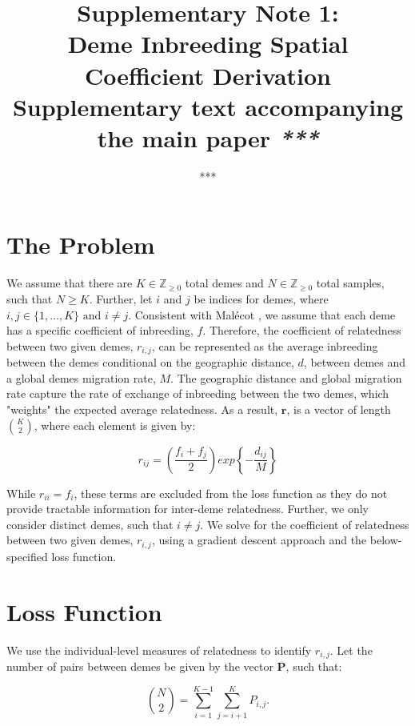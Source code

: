 \documentclass[a4paper, 12pt]{article}
\title{%
  Supplementary Note 1: \\ \vspace{2mm}
  Deme Inbreeding Spatial Coefficient Derivation \\ \vspace{2mm}
  \large Supplementary text accompanying the main paper \emph{***}}
\author{***}
\begin{document}
\maketitle

\section{The Problem}

We assume that there are $K \in \mathbb{Z}_{\geq 0}$ total demes and $N \in \mathbb{Z}_{\geq 0}$ total samples, such that $N \geq K$. Further, let $i$ and $j$ be indices for demes, where $ i, j \in \{1, \dots, K\} \text{ and } i \neq j$. Consistent with Mal\'ecot \cite{Malecot1970, Malecot1973}, we assume that each deme has a specific coefficient of inbreeding, $f$. Therefore, the coefficient of relatedness between two given demes, $r_{i,j}$, can be represented as the average inbreeding between the demes conditional on the geographic distance, $d$, between demes and a global demes migration rate, $M$. The geographic distance and global migration rate capture the rate of exchange of inbreeding between the two demes, which "weights" the expected average relatedness. As a result, $\mathbf{r}$, is a vector of length ${K\choose2}$, where each element is given by:

%
\begin{equation}
    r_{ij} = \left( \frac{f_i + f_j}{2} \right) exp\left\{ -\frac{d_{ij}}{M} \right\}
\end{equation}
%

While $r_{ii} = f_i$, these terms are excluded from the loss function as they do not provide tractable information for inter-deme relatedness.  Further, we only consider distinct demes, such that $i \neq j$. We solve for the coefficient of relatedness between two given demes, $r_{i,j}$, using a gradient descent approach and the below-specified loss function.


\section{Loss Function}
We use the individual-level measures of relatedness to identify $r_{i,j}$. Let the number of pairs between demes be given by the vector $\mathbf{P}$, such that:

%
\begin{equation}
{N\choose2} = \sum_{i=1}^{K-1} \sum_{j=i+1}^K P_{i,j} \textrm{.}
\end{equation}
%
\end{document}
